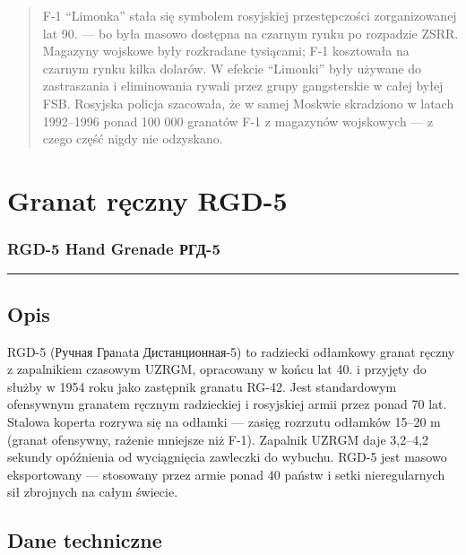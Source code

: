 \documentclass[12pt,openany,oneside]{book}
\begin{document}
\begin{quote}
F-1 ``Limonka'' stała się symbolem rosyjskiej przestępczości
zorganizowanej lat 90. --- bo była masowo dostępna na czarnym rynku po
rozpadzie ZSRR. Magazyny wojskowe były rozkradane tysiącami; F-1
kosztowała na czarnym rynku kilka dolarów. W efekcie ``Limonki'' były
używane do zastraszania i eliminowania rywali przez grupy gangsterskie w
całej byłej FSB. Rosyjska policja szacowała, że w samej Moskwie
skradziono w latach 1992--1996 ponad 100 000 granatów F-1 z magazynów
wojskowych --- z czego część nigdy nie odzyskano.
\end{quote}

\chapter{Granat ręczny RGD-5}\label{granat-rux119czny-rgd-5}

\subsection{RGD-5 Hand Grenade \textbar{}
РГД-5}\label{rgd-5-hand-grenade-ux440ux433ux434-5}

\begin{center}\rule{0.5\linewidth}{0.5pt}\end{center}

\section{Opis}\label{opis-102}

RGD-5 (Ручная Граnatа Дистанционная-5) to radziecki odłamkowy granat
ręczny z zapalnikiem czasowym UZRGM, opracowany w końcu lat 40. i
przyjęty do służby w 1954 roku jako zastępnik granatu RG-42. Jest
standardowym ofensywnym granatem ręcznym radzieckiej i rosyjskiej armii
przez ponad 70 lat. Stalowa koperta rozrywa się na odłamki --- zasięg
rozrzutu odłamków 15--20 m (granat ofensywny, rażenie mniejsze niż F-1).
Zapalnik UZRGM daje 3,2--4,2 sekundy opóźnienia od wyciągnięcia
zawleczki do wybuchu. RGD-5 jest masowo eksportowany --- stosowany przez
armie ponad 40 państw i setki nieregularnych sił zbrojnych na całym
świecie.

\section{Dane techniczne}\label{dane-techniczne-102}
\end{document}
